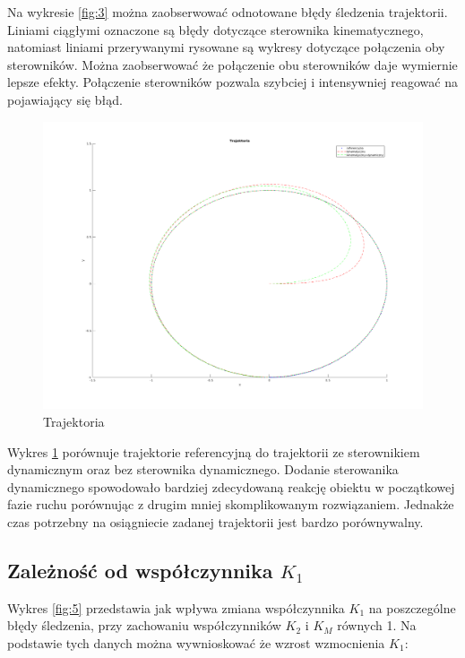\documentclass[12pt,a4paper]{article}
\begin{document}
    Na wykresie \ref{fig:3} można zaobserwować odnotowane błędy śledzenia trajektorii. Liniami ciągłymi oznaczone są błędy dotyczące sterownika kinematycznego, natomiast liniami przerywanymi rysowane są wykresy dotyczące połączenia oby sterowników. Można zaobserwować że połączenie obu sterowników daje wymiernie lepsze efekty. Połączenie sterowników pozwala szybciej i intensywniej reagować na pojawiający się błąd. 

    \begin{figure}[H]
      \centering
      \includegraphics[width=1\textwidth]{figures/dyn_trajektoria.png}
      \caption{Trajektoria}
      \label{fig:4}
    \end{figure}

    Wykres \ref{fig:4} porównuje trajektorie referencyjną do trajektorii ze sterownikiem dynamicznym oraz bez sterownika dynamicznego. Dodanie sterowanika dynamicznego spowodowało bardziej zdecydowaną reakcję obiektu w początkowej fazie ruchu porównując z drugim mniej skomplikowanym rozwiązaniem. Jednakże czas potrzebny na osiągniecie zadanej trajektorii jest bardzo porównywalny. 

  \subsection{Zależność od współczynnika $K_1$}
  Wykres \ref{fig:5} przedstawia jak wpływa zmiana współczynnika $K_1$ na poszczególne błędy śledzenia, przy zachowaniu współczynników $K_2$ i $K_M$ równych 1. Na podstawie tych danych można wywnioskować że wzrost wzmocnienia $K_1$:
\end{document}
